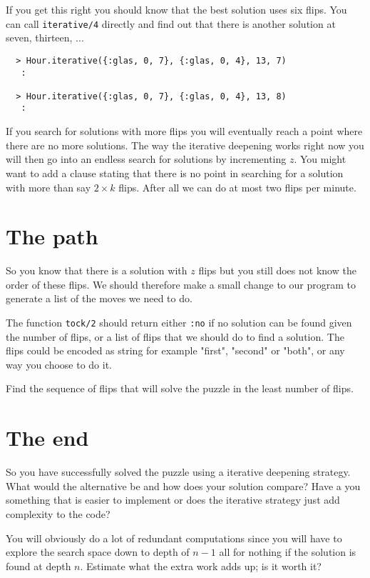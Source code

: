 \documentclass[a4paper,11pt]{article}
\begin{document}
If you get this right you should know that the best solution uses six
flips. You can call {\tt iterative/4} directly and find out that there
is another solution at seven, thirteen, ...

\begin{verbatim}
  > Hour.iterative({:glas, 0, 7}, {:glas, 0, 4}, 13, 7)
   :

  > Hour.iterative({:glas, 0, 7}, {:glas, 0, 4}, 13, 8)
   :
\end{verbatim}

If you search for solutions with more flips you will eventually reach
a point where there are no more solutions. The way the iterative
deepening works right now you will then go into an endless search for
solutions by incrementing $z$. You might want to add a clause stating
that there is no point in searching for a solution with more than say
$2\times k$ flips. After all we can do at most two flips per minute.

 
\section*{The path}

So you know that there is a solution with $z$ flips but you still does
not know the order of these flips. We should therefore make a small
change to our program to generate a list of the moves we need to do.

The function {\tt tock/2} should return either {\tt :no} if no
solution can be found given the number of flips, or a list of flips
that we should do to find a solution. The flips could be encoded as
string for example "first", "second" or "both", or any way you choose
to do it.

Find the sequence of flips that will solve the puzzle in the least
number of flips.

\section*{The end}

So you have successfully solved the puzzle using a iterative deepening
strategy. What would the alternative be and how does your solution
compare? Have a you something that is easier to implement or does the
iterative strategy just add complexity to the code?

You will obviously do a lot of redundant computations since
you will have to explore the search space down to depth of $n-1$ all
for nothing if the solution is found at depth $n$. Estimate what the
extra work adds up; is it worth it?




  
\end{document}
